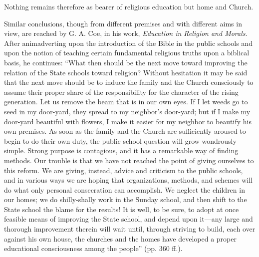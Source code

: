 Nothing remains therefore as bearer of religious education but home and Church.

Similar conclusions, though from different premises and with different aims in view, are reached by G. A. Coe, in his work, \emph{Education in Religion and Morals}. After animadverting upon the introduction of the Bible in the public schools and upon the notion of teaching certain fundamental religious truths upon a biblical basis, he continues: “What then should be the next move toward improving the relation of the State schools toward religion? Without hesitation it may be said that the next move should be to induce the family and the Church consciously to assume their proper share of the responsibility for the character of the rising generation. Let us remove the beam that is in our own eyes. If I let weeds go to seed in my door-yard, they spread to my neighbor’s door-yard; but if I make my door-yard beautiful with flowers, I make it easier for my neighbor to beautify his own premises. As soon as the family and the Church are sufficiently aroused to begin to do their own duty, the public school question will grow wondrously simple. Strong purpose is contagious, and it has a remarkable way of finding methods. Our trouble is that we have not reached the point of giving ourselves to this reform. We are giving, instead, advice and criticism to the public schools, and in various ways we are hoping that organizations, methods, and schemes will do what only personal consecration can accomplish. We neglect the children in our homes; we do shilly-shally work in the Sunday school, and then shift to the State school the blame for the results! It is well, to be sure, to adopt at once feasible means of improving the State school, and depend upon it—any large and thorough improvement therein will wait until, through striving to build, each over against his own house, the churches and the homes have developed a proper educational consciousness among the people” (pp. 360 ff.).

